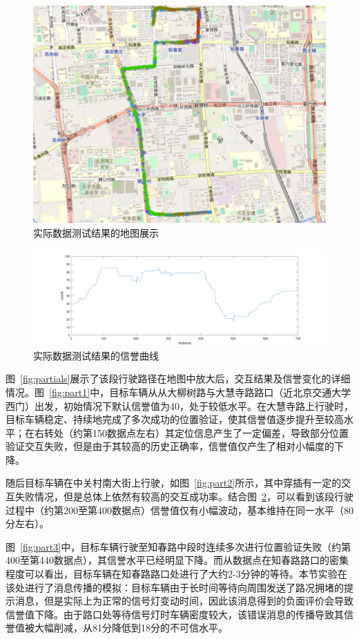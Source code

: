 \begin{figure}
  \centering
  \includegraphics[width=0.8\linewidth]{figures/overview.png}
  \caption{实际数据测试结果的地图展示}
  \label{fig:taximap}
\end{figure}

\begin{figure}
  \centering
  \includegraphics[width=1\linewidth]{figures/taxitest.png}
  \caption{实际数据测试结果的信誉曲线}
  \label{fig:taxiplot}
\end{figure}

图~\ref{fig:partials}展示了该段行驶路径在地图中放大后，交互结果及信誉变化的详细情况。图~\ref{fig:part1}中，目标车辆从从大柳树路与大慧寺路路口（近北京交通大学西门）出发，初始情况下默认信誉值为40，处于较低水平。在大慧寺路上行驶时，目标车辆稳定、持续地完成了多次成功的位置验证，使其信誉值逐步提升至较高水平；在右转处（约第150数据点左右）其定位信息产生了一定偏差，导致部分位置验证交互失败，但是由于其较高的历史正确率，信誉值仅产生了相对小幅度的下降。

随后目标车辆在中关村南大街上行驶，如图~\ref{fig:part2}所示，其中穿插有一定的交互失败情况，但是总体上依然有较高的交互成功率。结合图~\ref{fig:taxiplot}，可以看到该段行驶过程中（约第200至第400数据点）信誉值仅有小幅波动，基本维持在同一水平（80分左右）。

图~\ref{fig:part3}中，目标车辆行驶至知春路中段时连续多次进行位置验证失败（约第400至第440数据点），其信誉水平已经明显下降。而从数据点在知春路路口的密集程度可以看出，目标车辆在知春路路口处进行了大约2-3分钟的等待。本节实验在该处进行了消息传播的模拟：目标车辆由于长时间等待向周围发送了路况拥堵的提示消息，但是实际上为正常的信号灯变动时间，因此该消息得到的负面评价会导致信誉值下降。由于路口处等待信号灯时车辆密度较大，该错误消息的传播导致其信誉值被大幅削减，从81分降低到18分的不可信水平。


